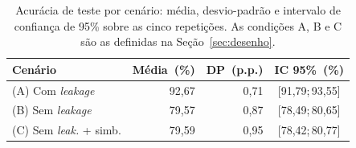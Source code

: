 \begin{table}[h]
\centering
\small
\caption{Acurácia de teste por cenário: média, desvio-padrão e intervalo
de confiança de 95\% sobre as cinco repetições. As condições A, B e C são
as definidas na Seção~\ref{sec:desenho}.}
\label{tab:descritiva}
\begin{tabular}{@{}lrrc@{}}
\toprule
\textbf{Cenário} & \textbf{Média}~(\%) & \textbf{DP}~(p.p.) & \textbf{IC 95\%}~(\%) \\
\midrule
(A) Com \textit{leakage} & 92,67 & 0,71 & [91,79;\,93,55] \\
(B) Sem \textit{leakage} & 79,57 & 0,87 & [78,49;\,80,65] \\
(C) Sem \textit{leak.} + simb. & 79,59 & 0,95 & [78,42;\,80,77] \\
\bottomrule
\end{tabular}
\end{table}
